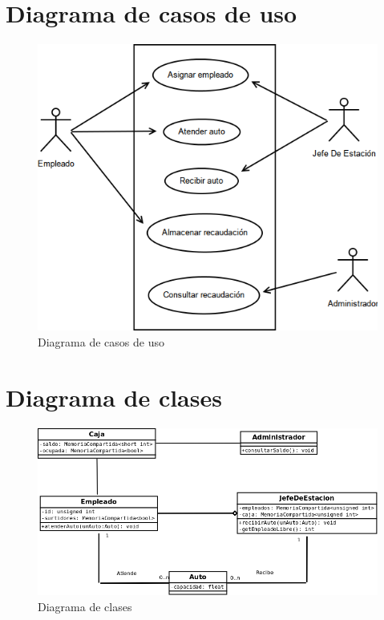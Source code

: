 \documentclass[12pt,a4paper,titlepage,oneside]{article}
\begin{document}
\section{Diagrama de casos de uso}
\begin{figure}[hbtp]
\begin{center}
\includegraphics[scale=0.5]{diagramaDeCasosDeUso.png} 
\end{center}
\caption{Diagrama de casos de uso}
\end{figure}

\section{Diagrama de clases}
\begin{figure}[hbtp]
\centering
\includegraphics[scale=0.5]{diagramaDeClases.png}
\caption{Diagrama de clases}
\end{figure}
\end{document}
